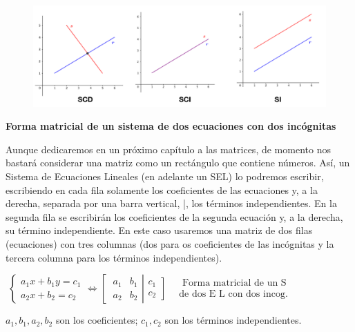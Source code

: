 	\begin{figure}[H]
		\centering
		\includegraphics[width=1\textwidth]{imagenes/imagenes01/T01IM02.png}
	\end{figure}


\noindent \textbf{Forma matricial de un sistema de dos ecuaciones con dos incógnitas}
\vspace{4mm}

Aunque dedicaremos en un próximo capítulo a las matrices, de momento nos bastará considerar una matriz como un rectángulo que contiene números. Así, un Sistema de Ecuaciones Lineales (en adelante un SEL) lo podremos escribir, escribiendo en cada fila solamente los coeficientes de las ecuaciones y, a la derecha, separada por una barra vertical, |, los términos independientes. En la segunda fila se escribirán los coeficientes de la segunda ecuación y, a la derecha, su término independiente. En este caso usaremos una matriz de dos filas (ecuaciones) con tres columnas (dos para os coeficientes de las incógnitas  y la tercera columna para los términos independientes).

\vspace{4mm} \centerline{$\boxed{\; \begin{cases}a_1x+b_1y=c_1\\a_2x+b_2=c_2\end{cases} \Leftrightarrow 
\left[
\begin{matrix}
\; a_1&b_1\\
\; a_2&b_2	
\end{matrix}
\right|
\left.
\begin{matrix}
c_1\\c_2	
\end{matrix}
\right]\;} \; $
$\begin{matrix}\text{ Forma matricial de un S }\\\text{de dos E L con dos incog.}\end{matrix}$}

\vspace{4mm} $a_1, b_1, a_2, b_2$ son los coeficientes; $c_1, c_2$ son los términos independientes.

